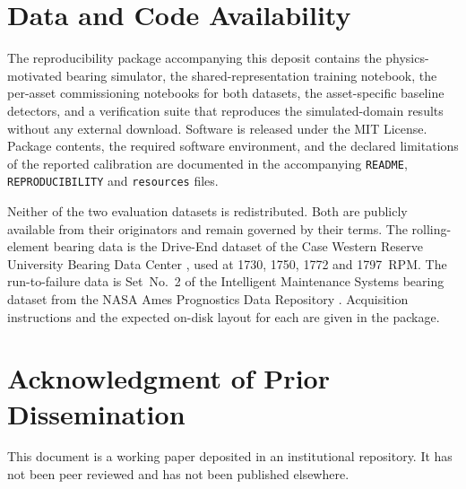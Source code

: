 \documentclass{trbunofficial}
\begin{document}
\section*{Data and Code Availability}

The reproducibility package accompanying this deposit contains the
physics-motivated bearing simulator, the shared-representation training
notebook, the per-asset commissioning notebooks for both datasets, the
asset-specific baseline detectors, and a verification suite that reproduces
the simulated-domain results without any external download. Software is
released under the MIT License. Package contents, the required software
environment, and the declared limitations of the reported calibration are
documented in the accompanying \texttt{README}, \texttt{REPRODUCIBILITY} and
\texttt{resources} files.

Neither of the two evaluation datasets is redistributed. Both are publicly
available from their originators and remain governed by their terms. The
rolling-element bearing data is the Drive-End dataset of the Case Western
Reserve University Bearing Data Center \citep{smith2015}, used at 1730, 1750,
1772 and 1797~RPM. The run-to-failure data is Set~No.~2 of the Intelligent
Maintenance Systems bearing dataset from the NASA Ames Prognostics Data
Repository \citep{ims2007}. Acquisition instructions and the expected on-disk
layout for each are given in the package.

\section*{Acknowledgment of Prior Dissemination}

This document is a working paper deposited in an institutional repository. It
has not been peer reviewed and has not been published elsewhere.


% 


\end{document}

